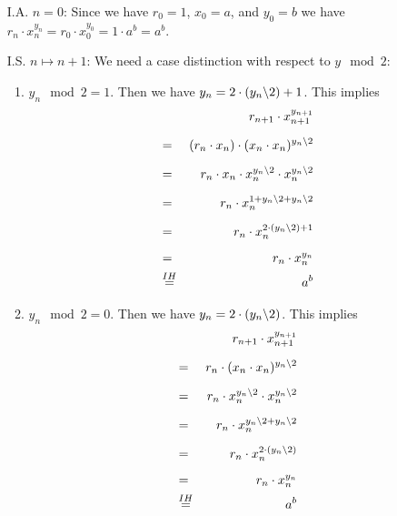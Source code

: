 \begin{enumerate}
\item[I.A.] $n=0$: Since we have $r_0 = 1$, $x_0 = a$, and $y_0 = b$ we have 
            \\[0.2cm]
            \hspace*{1.3cm}
            $r_n \cdot x_n^{y_n} = r_0 \cdot x_0^{y_0} = 1 \cdot a^{b} = a^b$.
\item[I.S.] $n \mapsto n + 1$:  We need a case distinction with respect to $y \mod 2$:
            \begin{enumerate}
            \item $y_n \mod 2 = 1$.  Then we have $y_{n} = 2 \cdot (y_n\symbol{92}2) + 1$.
                  This implies
                  \begin{eqnarray*}
                      &   & r_{n+1} \cdot x_{n+1}^{y_{n+1}} \\[0.2cm] 
                      & = & (r_{n} \cdot x_n) \cdot (x_{n} \cdot x_{n})^{y_{n}\symbol{92}2} \\[0.2cm] 
                      & = & r_{n} \cdot x_n \cdot x_{n}^{y_{n}\symbol{92}2} \cdot x_{n}^{y_{n}\symbol{92}2} \\[0.2cm] 
                      & = & r_{n} \cdot x_n^{1 + y_{n}\symbol{92}2 + y_{n}\symbol{92}2} \\[0.2cm] 
                      & = & r_{n} \cdot x_n^{2 \cdot (y_{n}\symbol{92}2) + 1} \\[0.2cm] 
                      & = & r_{n} \cdot x_n^{y_n} \\
                      & \stackrel{IH}{=} & a^{b} 
                  \end{eqnarray*}
\pagebreak

            \item $y_n \mod 2 = 0$.  Then we have $y_{n} = 2 \cdot (y_n\symbol{92}2)$.
                  This implies
                  \begin{eqnarray*}
                      &   & r_{n+1} \cdot x_{n+1}^{y_{n+1}} \\[0.2cm] 
                      & = & r_{n} \cdot (x_{n} \cdot x_{n})^{y_{n}\symbol{92}2} \\[0.2cm] 
                      & = & r_{n} \cdot x_{n}^{y_{n}\symbol{92}2} \cdot x_{n}^{y_{n}\symbol{92}2} \\[0.2cm] 
                      & = & r_{n} \cdot x_n^{y_{n}\symbol{92}2 + y_{n}\symbol{92}2} \\[0.2cm] 
                      & = & r_{n} \cdot x_n^{2 \cdot (y_{n} \symbol{92}  2)} \\[0.2cm] 
                      & = & r_{n} \cdot x_n^{y_n} \\
                      & \stackrel{IH}{=} & a^{b} 
                  \end{eqnarray*}
            \end{enumerate}
\end{enumerate}
